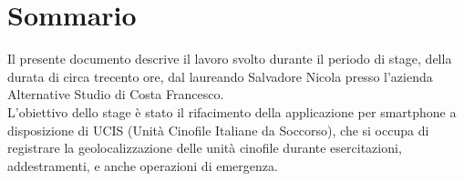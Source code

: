 
\cleardoublepage
{}
{}
\begingroup
\let\clearpage\relax
\let\cleardoublepage\relax
\let\cleardoublepage\relax

\chapter*{Sommario}

Il presente documento descrive il lavoro svolto durante il periodo di stage, della durata di circa trecento ore, dal laureando Salvadore Nicola presso l'azienda Alternative Studio di Costa Francesco.\\

\noindent L'obiettivo dello stage è stato il rifacimento della applicazione per smartphone a disposizione di UCIS (Unità Cinofile Italiane da Soccorso), che si occupa di registrare la geolocalizzazione delle unità cinofile durante  esercitazioni, addestramenti, e anche operazioni di emergenza.\\

%
%

\endgroup

\vfill
